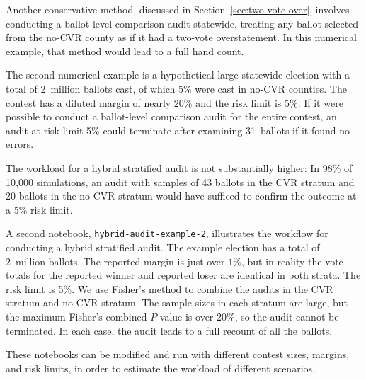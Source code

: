 \documentclass[runningheads]{llncs}
\begin{document}
Another conservative method, discussed in Section~\ref{sec:two-vote-over},
involves conducting a ballot-level comparison audit statewide,
treating any ballot selected from the no-CVR county as if it had a two-vote overstatement.
In this numerical example, that method would lead to a full hand count.

The second numerical example is a hypothetical large statewide election with a total of 
2~million ballots cast, of which 5\% were cast in no-CVR counties.
The contest has a diluted margin of nearly $20\%$ and the risk limit is 5\%.
If it were possible to conduct a ballot-level comparison audit for the entire contest, 
an audit at risk limit 5\% could terminate after examining 31~ballots if it found no errors.

The workload for a hybrid stratified audit is not substantially higher:
In 98\% of 10,000 simulations, an audit with samples of 43 ballots in the 
CVR stratum and 20 ballots in the no-CVR stratum
would have sufficed to confirm the outcome at a 5\% risk limit.

A second notebook, \texttt{hybrid-audit-example-2}, illustrates the workflow for conducting a hybrid 
stratified audit.
The example election has a total of 2~million ballots.
The reported margin is just over $1\%$, but in reality the vote totals for the reported winner
and reported loser are identical in both strata.  The risk limit is 5\%.
We use Fisher's method to combine the audits in the CVR stratum and no-CVR stratum.
The sample sizes in each stratum are large, but the maximum Fisher's combined $P$-value is over 20\%,
so the audit cannot be terminated.
In each case, the audit leads to a full recount of all the ballots.

These notebooks can be modified and run with different contest sizes, margins, and risk limits, in order to
estimate the workload of different scenarios.


\end{document}
